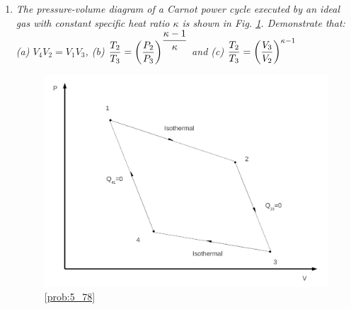 \begin{enumerate}
\item \label{prob:5_78}{\it The pressure-volume diagram of a Carnot power cycle executed by an ideal gas with constant specific heat ratio $\kappa$ is shown in Fig. \ref{Prob_Saphiro_5.78}. Demonstrate that: (a) $V_{4}V_{2}=V_{1}V_{3}$, (b) $\displaystyle\frac{T_{2}}{T_{3}} = \left(\displaystyle\frac{P_{2}}{P_{3}}\right)^{\displaystyle\frac{\kappa - 1}{\kappa}}$ and (c) $\displaystyle\frac{T_{2}}{T_{3}}=\left(\displaystyle\frac{V_{3}}{V_{2}}\right)^{\kappa - 1}$}
\begin{figure}[h]
\begin{center}
\includegraphics[width=15.cm,clip]{./../../ThermalEngines/Pics/Problem_5_78}
\caption{ \ref{prob:5_78}}
\label{Prob_Saphiro_5.78}
\end{center}
\end{figure}


\end{enumerate}
